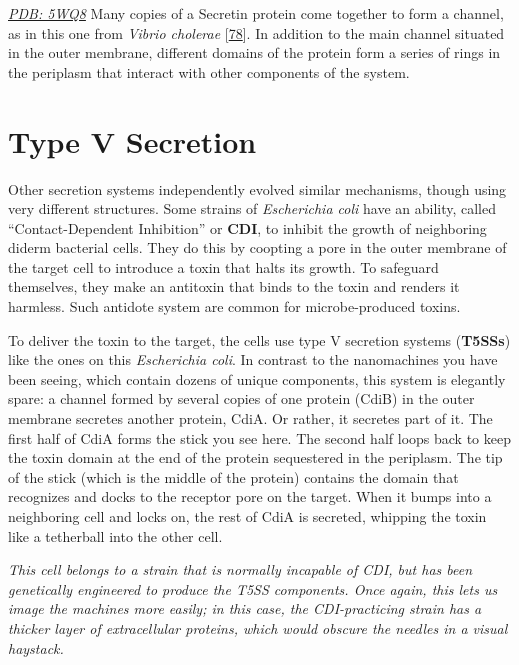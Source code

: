 \documentclass[]{tufte-book}
\begin{document}
\href{http://rcsb.org/structure/5WQ8}{\emph{PDB: 5WQ8}}
Many copies of a Secretin protein come together to form a channel, as in this one from \emph{Vibrio cholerae} {[}\protect\hyperlink{ref-yan2017a}{78}{]}. In addition to the main channel situated in the outer membrane, different domains of the protein form a series of rings in the periplasm that interact with other components of the system.

\hypertarget{type-v-secretion}{%
\section{Type V Secretion}\label{type-v-secretion}}

Other secretion systems independently evolved similar mechanisms, though using very different structures. Some strains of \emph{Escherichia coli} have an ability, called ``Contact-Dependent Inhibition'' or \textbf{CDI}, to inhibit the growth of neighboring diderm bacterial cells. They do this by coopting a pore in the outer membrane of the target cell to introduce a toxin that halts its growth. To safeguard themselves, they make an antitoxin that binds to the toxin and renders it harmless. Such antidote system are common for microbe-produced toxins.

To deliver the toxin to the target, the cells use type V secretion systems (\textbf{T5SSs}) like the ones on this \emph{Escherichia coli}. In contrast to the nanomachines you have been seeing, which contain dozens of unique components, this system is elegantly spare: a channel formed by several copies of one protein (CdiB) in the outer membrane secretes another protein, CdiA. Or rather, it secretes part of it. The first half of CdiA forms the stick you see here. The second half loops back to keep the toxin domain at the end of the protein sequestered in the periplasm. The tip of the stick (which is the middle of the protein) contains the domain that recognizes and docks to the receptor pore on the target. When it bumps into a neighboring cell and locks on, the rest of CdiA is secreted, whipping the toxin like a tetherball into the other cell.

\emph{This cell belongs to a strain that is normally incapable of CDI, but has been genetically engineered to produce the T5SS components. Once again, this lets us image the machines more easily; in this case, the CDI-practicing strain has a thicker layer of extracellular proteins, which would obscure the needles in a visual haystack.}
\end{document}
